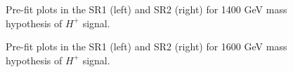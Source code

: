 \begin{figure}[H]
  \centering
  \caption{Pre-fit plots in the SR1 (left) and SR2 (right) for 1400 GeV mass hypothesis of $H^{+}$ signal.}
  \label{fig:Prefit_Hp1400_Asimov}
\end{figure}
\begin{figure}[H]
  \centering
  \caption{Pre-fit plots in the SR1 (left) and SR2 (right) for 1600 GeV mass hypothesis of $H^{+}$ signal.}
  \label{fig:Prefit_Hp1600_Asimov}
\end{figure}
